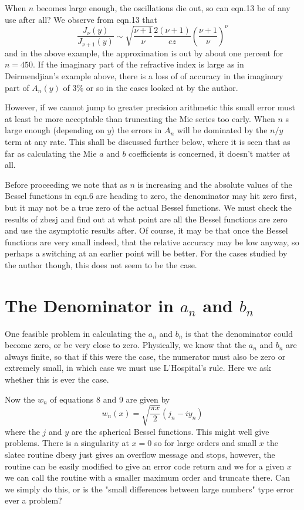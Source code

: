 When $n$ becomes large enough, the oscillations die out, so can
 eqn.13 be of any use after all? We observe from eqn.13 that
\begin{equation}
\frac{  J_\nu(y)  }{  J_{\nu+1}(y)   } \sim 
   \sqrt{   \frac{\nu+1}{\nu}  }
   \frac{  2(\nu+1)  }{e  z}
 \left ( \frac{\nu+1}{\nu} \right )^\nu 
\end{equation}
and in the above example, the approximation is out by  about one percent
for $n=450$. 
 If the imaginary part of 
the refractive index is large as in Deirmendjian's example above, there
is a loss of of accuracy in the imaginary part of $A_n(y)$ of 3\% or so
in the cases looked at by the author.

However, if we cannot jump to greater precision arithmetic
this small error must at least be more acceptable than truncating
the Mie series too early. When $n$ s large enough (depending on $y$)
the errors in $A_n$ will be dominated by the $n/y$ term at any rate.
 This shall be discussed further below, where it is seen that as far as calculating the 
Mie $a$ and $b$ coefficients is concerned, it doesn't matter at all.

Before proceeding we note that as $n$ is increasing and the absolute
values of the Bessel functions in eqn.6 are heading to zero, the 
denominator may hit zero first, but it may not be a true zero
of the actual Bessel functions. We must check the results of zbesj
and find out at what point are all the Bessel functions are zero
and use the asymptotic results after. Of course, it may be that 
once the Bessel functions are very small indeed, that the relative
accuracy may be low anyway, so perhaps a switching at an earlier
point will be better. For the cases studied by the author though, this does
not seem to be the case.

\section{The Denominator in $a_n$ and $b_n$}

One feasible problem in calculating the $a_n$ and $b_n$ is that the denominator
could become zero, or be very close to zero. Physically, we know that the $a_n$ and
$b_n$ are always finite, so that if this were the case, the numerator must also be zero
or extremely small, in which case we must use L'Hospital's rule. Here we ask whether this
is ever the case.

Now the $w_n$ of equations 8 and 9 are given by
\begin{equation}
w_n(x)=\sqrt{ \frac{\pi x}{2}  } (j_n - i y_n)
\end{equation}
where the $j$ and $y$ are  the spherical Bessel functions.
This might well give problems. There is a singularity at $x=0$
so for large orders and small $x$ the slatec routine dbesy just gives
an overflow message and stops, however, the routine can be easily modified
to give an error code return and we for a given $x$ we can call the routine
with a smaller maximum order and truncate there. Can we simply do this, or is
the "small differences between large numbers" type error ever a problem?

